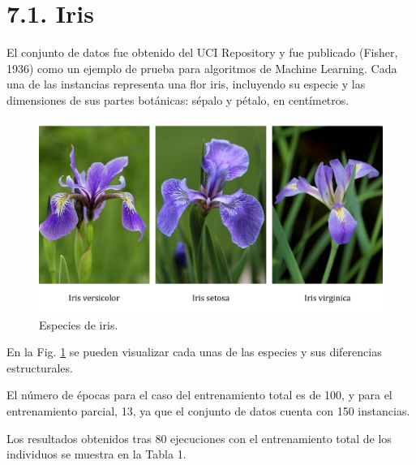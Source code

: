 \documentclass[spanish,a4paper,12pt,twoside]{report}
\begin{document}
  \section*{\Large 7.1. Iris}
  El conjunto de datos fue obtenido del UCI Repository y fue publicado (Fisher, 1936) como un ejemplo de prueba para algoritmos de Machine Learning. Cada una de las instancias representa una flor iris, incluyendo su especie y las dimensiones de sus partes botánicas: sépalo y pétalo, en centímetros. \par
  \begin{figure}[H]
    \centering
    \includegraphics[width = 1\textwidth]{resources/Fig17.pdf}
    \caption{Especies de iris.}
    \label{fig:17}
  \end{figure} \vfill
  En la Fig. \ref{fig:17} se pueden visualizar cada unas de las especies y sus diferencias estructurales. \par
  El número de épocas para el caso del entrenamiento total es de 100, y para el entrenamiento parcial, 13, ya que el conjunto de datos cuenta con 150 instancias. \par
  Los resultados obtenidos tras 80 ejecuciones con el entrenamiento total de los individuos se muestra en la Tabla 1.
\end{document}
